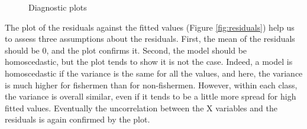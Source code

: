 \documentclass[12pt,]{article}
\begin{document}
\begin{figure}[htbp]

{\centering {}

}

\caption{Diagnostic plots}\label{fig:unnamed-chunk-18}
\end{figure}

The plot of the residuals against the fitted values (Figure
\ref{fig:residuals}) help us to assess three assumptions about the
residuals. First, the mean of the residuals should be 0, and the plot
confirms it. Second, the model should be homoscedastic, but the plot
tends to show it is not the case. Indeed, a model is homoscedastic if
the variance is the same for all the values, and here, the variance is
much higher for fishermen than for non-fishermen. However, within each
class, the variance is overall similar, even if it tends to be a little
more spread for high fitted values. Eventually the uncorrelation between
the X variables and the residuals is again confirmed by the plot.
\end{document}
